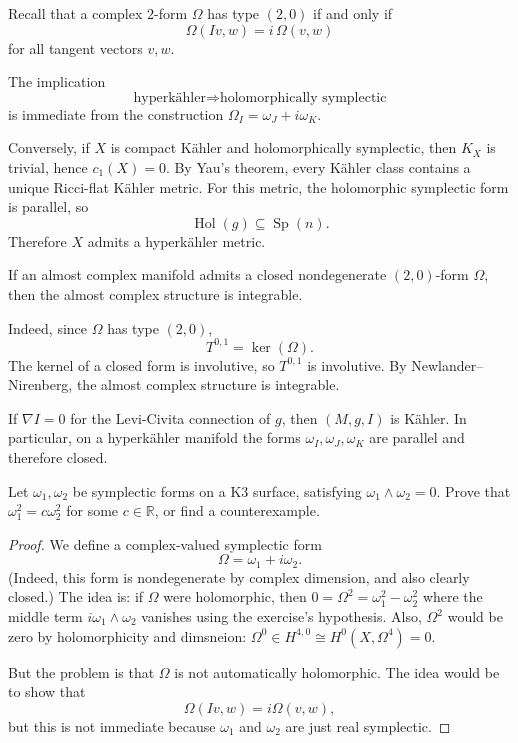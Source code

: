 Recall that a complex $2$-form 
$\Omega$ has type $(2,0)$
if and only if
$$
\Omega(Iv,w)=i\,\Omega(v,w)
$$
for all tangent vectors $v,w$.

\medskip\noindent
The implication
$$
\text{hyperkähler}
\Longrightarrow
\text{holomorphically symplectic}
$$
is immediate from the construction
$\Omega_I=\omega_J+i\omega_K$.

Conversely, if $X$ is compact Kähler and
holomorphically symplectic, then $K_X$ is
trivial, hence $c_1(X)=0$. By Yau's theorem,
every Kähler class contains a unique Ricci-flat
Kähler metric. For this metric, the holomorphic
symplectic form is parallel, so
$$
\operatorname{Hol}(g)\subseteq \operatorname{Sp}(n).
$$
Therefore $X$ admits a hyperkähler metric.

\begin{remark}
If an almost complex manifold admits a closed
nondegenerate $(2,0)$-form $\Omega$, then the
almost complex structure is integrable.

Indeed, since $\Omega$ has type $(2,0)$,
$$
T^{0,1}=\ker(\Omega).
$$
The kernel of a closed form is involutive, so
$T^{0,1}$ is involutive. By Newlander--Nirenberg,
the almost complex structure is integrable.
\end{remark}

\begin{remark}
If $\nabla I=0$ for the Levi-Civita connection
of $g$, then $(M,g,I)$ is Kähler. In particular,
on a hyperkähler manifold the forms
$\omega_I,\omega_J,\omega_K$ are parallel and
therefore closed.
\end{remark}

\begin{exercise}
\label{exercise-symplectic-forms-on-k3}
Let $\omega_1,\omega_2$ be symplectic
forms on a K3 surface,
satisfying $\omega_1 \wedge \omega_2=0$.
Prove that $\omega_1^2 = c\omega_2^2$
for some $c \in \mathbb{R}$,
or find a counterexample.
\end{exercise}

\begin{proof}
We define a complex-valued symplectic form
$$
\Omega=\omega_1 + i \omega_2.
$$
(Indeed, this form is nondegenerate
by complex dimension, 
and also clearly closed.)
The idea is: if $\Omega$ were holomorphic,
then $0=\Omega^2 = \omega_1^2-\omega_2^2$
where 
the middle term $i\omega_1 \wedge \omega_2$
vanishes using the exercise's hypothesis.
Also, $\Omega^2$ would be zero by
holomorphicity and dimsneion: 
$\Omega^0\in H^{4,0}\cong H^0(X,\Omega^4)=0$.

But the problem is that $\Omega$ is not
automatically holomorphic.
The idea would be to show that
$$
\Omega(Iv,w)=i\Omega(v,w),
$$
but this is not immediate because 
$\omega_1$ and $\omega_2$
are just real symplectic.
\end{proof}


